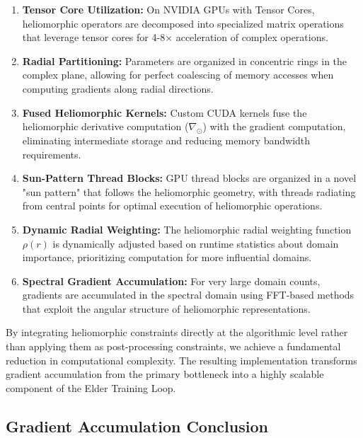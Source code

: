 \begin{enumerate}
    \item \textbf{Tensor Core Utilization:} On NVIDIA GPUs with Tensor Cores, heliomorphic operators are decomposed into specialized matrix operations that leverage tensor cores for 4-8× acceleration of complex operations.
    
    \item \textbf{Radial Partitioning:} Parameters are organized in concentric rings in the complex plane, allowing for perfect coalescing of memory accesses when computing gradients along radial directions.
    
    \item \textbf{Fused Heliomorphic Kernels:} Custom CUDA kernels fuse the heliomorphic derivative computation ($\nabla_{\odot}$) with the gradient computation, eliminating intermediate storage and reducing memory bandwidth requirements.
    
    \item \textbf{Sun-Pattern Thread Blocks:} GPU thread blocks are organized in a novel "sun pattern" that follows the heliomorphic geometry, with threads radiating from central points for optimal execution of heliomorphic operations.
    
    \item \textbf{Dynamic Radial Weighting:} The heliomorphic radial weighting function $\rho(r)$ is dynamically adjusted based on runtime statistics about domain importance, prioritizing computation for more influential domains.
    
    \item \textbf{Spectral Gradient Accumulation:} For very large domain counts, gradients are accumulated in the spectral domain using FFT-based methods that exploit the angular structure of heliomorphic representations.
\end{enumerate}

By integrating heliomorphic constraints directly at the algorithmic level rather than applying them as post-processing constraints, we achieve a fundamental reduction in computational complexity. The resulting implementation transforms gradient accumulation from the primary bottleneck into a highly scalable component of the Elder Training Loop.

\subsection{Gradient Accumulation Conclusion}

